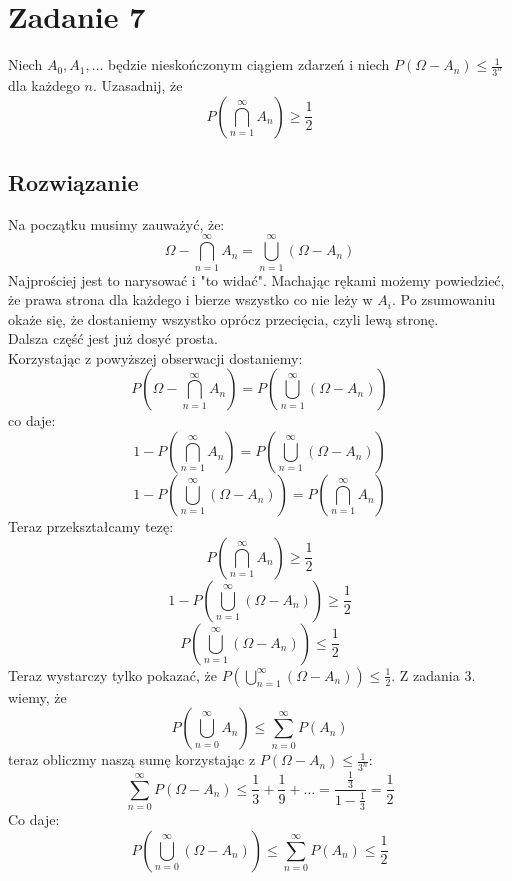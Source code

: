 \section{Zadanie 7}
Niech \(A_0,A_1,\dots\) będzie nieskończonym ciągiem zdarzeń i niech \(P(\Omega-A_n)\le \frac{1}{3^n}\) dla każdego \(n\). Uzasadnij, że
\[P(\bigcap_{n=1}^\infty A_n) \ge \frac{1}{2}\]
\subsection*{Rozwiązanie}
Na początku musimy zauważyć, że:
\[\Omega-\bigcap_{n=1}^\infty A_n=\bigcup_{n=1}^\infty (\Omega-A_n)\]
Najprościej jest to narysować i "to widać". Machając rękami możemy powiedzieć, że prawa strona dla każdego i bierze wszystko co nie leży w \(A_i\).
Po zsumowaniu okaże się, że dostaniemy wszystko oprócz przecięcia, czyli lewą stronę.\\
Dalsza część jest już dosyć prosta.\\
Korzystając z powyższej obserwacji dostaniemy:
\[P(\Omega-\bigcap_{n=1}^\infty A_n)=P(\bigcup_{n=1}^\infty (\Omega-A_n))\]
co daje:
\[1-P(\bigcap_{n=1}^\infty A_n)=P(\bigcup_{n=1}^\infty (\Omega-A_n))\]
\[1-P(\bigcup_{n=1}^\infty (\Omega-A_n))=P(\bigcap_{n=1}^\infty A_n)\]
Teraz przekształcamy tezę:
\[P(\bigcap_{n=1}^\infty A_n) \ge \frac{1}{2}\]
\[1-P(\bigcup_{n=1}^\infty (\Omega-A_n))\ge \frac{1}{2}\]
\[P(\bigcup_{n=1}^\infty (\Omega-A_n))\le \frac{1}{2}\]
Teraz wystarczy tylko pokazać, że \(P(\bigcup_{n=1}^\infty (\Omega-A_n))\le \frac{1}{2}\). Z zadania 3. wiemy, że
\[P(\bigcup_{n=0}^\infty A_n) \le \sum_{n=0}^\infty P(A_n)\]
teraz obliczmy naszą sumę korzystając z \(P(\Omega-A_n)\le \frac{1}{3^n}\):
\[\sum_{n=0}^\infty P(\Omega - A_n)\le \frac{1}{3}+\frac{1}{9}+\dots = \frac{\frac{1}{3}}{1-\frac{1}{3}}=\frac{1}{2}\]
Co daje:
\[P(\bigcup_{n=0}^\infty (\Omega-A_n)) \le \sum_{n=0}^\infty P(A_n)\le \frac{1}{2}\]